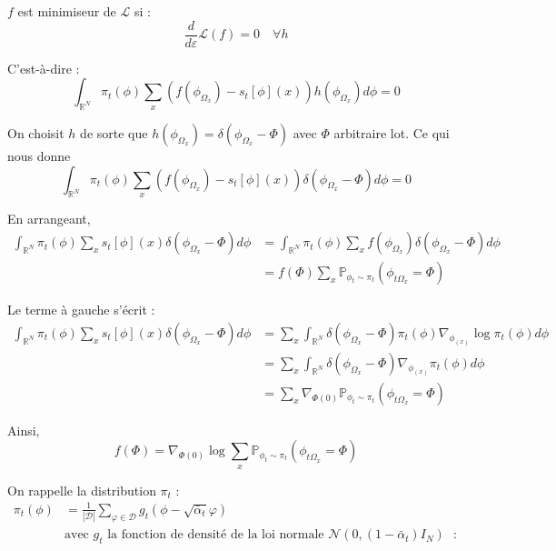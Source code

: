 \documentclass[a4paper,10pt]{article}
\theoremstyle{definition} %
\theoremstyle{definition} %
\theoremstyle{definition} %
\theoremstyle{definition} %
\newcommand{\R}{\mathbb{R}}
\begin{document}
$f$ est minimiseur de $\mathcal{L}$ si :
\begin{equation*}
    \frac{d}{d\varepsilon} \mathcal{L}(f) = 0 \quad \forall h
\end{equation*}

C'est-à-dire :
\begin{equation*}
    \int_{\R^N} \pi_t(\phi) \sum\limits_x \left( f(\phi_{\Omega_x}) - s_t [\phi](x) \right) h(\phi_{\Omega_x}) d\phi = 0
\end{equation*}

On choisit $h$ de sorte que $h(\phi_{\Omega_x}) = \delta(\phi_{\Omega_x} - \Phi)$ avec $\Phi$ arbitraire lot. Ce qui nous donne
\begin{equation*}
    \int_{\R^N} \pi_t(\phi) \sum\limits_x \left( f(\phi_{\Omega_x}) - s_t [\phi](x) \right) \delta(\phi_{\Omega_x} - \Phi) d\phi = 0
\end{equation*}

En arrangeant,
\begin{align*}
    \int_{\R^N} \pi_t(\phi) \sum\limits_x s_t [\phi](x) \delta(\phi_{\Omega_x} - \Phi) d\phi &= \int_{\R^N} \pi_t(\phi) \sum\limits_x f(\phi_{\Omega_x}) \delta(\phi_{\Omega_x} - \Phi) d\phi \\
    &= f(\Phi) \sum\limits_x \mathbb{P}_{\phi_t \sim \pi_t} (\phi_{t\Omega_x} = \Phi)
\end{align*}

Le terme à gauche s’écrit :
\begin{align*}
    \int_{\mathbb{R}^N} \pi_t(\phi) \sum\limits_x s_t[\phi](x) \delta(\phi_{\Omega_x} - \Phi) d\phi &= \sum\limits_x \int_{\mathbb{R}^N} \delta(\phi_{\Omega_x} - \Phi) \pi_t(\phi) \nabla_{\phi_(x)} \log \pi_t(\phi) d\phi\\
    &= \sum\limits_x \int_{\mathbb{R}^N} \delta(\phi_{\Omega_x} - \Phi) \nabla_{\phi_(x)}\pi_t(\phi) d\phi\\
    &= \sum\limits_x \nabla_{\Phi(0)} \mathbb{P}_{\phi_t \sim \pi_t} \left(\phi_{t\Omega_x} = \Phi \right)
\end{align*}



Ainsi,
\begin{equation*}
    f(\Phi) = \nabla_{\Phi(0)} \log \sum\limits_x \mathbb{P}_{\phi_t \sim \pi_t} \left(\phi_{t\Omega_x} = \Phi \right)
\end{equation*}

On rappelle la distribution \(\pi_t\) :
\begin{align*}
        \pi_t(\phi) &= \frac{1}{|\mathcal{D}|} \sum\limits_{\varphi \in \mathcal{D}} g_t (\phi - \sqrt{\bar \alpha_t} \varphi)\\
        & \text{avec \(g_t \) la fonction de densité de la loi normale $\mathcal{N}(0, (1 - \bar \alpha_t) I_N)$ }:
\end{align*}
\end{document}
